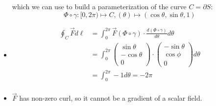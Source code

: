 \documentclass[11pt]{article}
\begin{document}
\begin{solution}
\begin{itemize}
	which we can use to build a parameterization of the curve $C = \partial S$:
	$$
	\Phi \circ \gamma: [0,2\pi) \mapsto C, (\theta) \mapsto (\cos\theta, \sin\theta, 1)
	$$
     \item 
	\begin{align*}
	\oint_C \vec{F} d\ell &= \int_0^{2\pi} \vec{F}(\Phi\circ \gamma)\cdot \frac{d(\Phi\circ \gamma)}{d\theta}  d \theta\\
	 &= \int_0^{2\pi} \begin{pmatrix} \sin\theta\\ -\cos\theta\\ 0 \end{pmatrix}\cdot \begin{pmatrix}-\sin\theta \\ \cos\phi \\ 0\end{pmatrix} d \theta\\
	&= \int_0^{2\pi} -1 d \theta = -2\pi\\
     \end{align*}   
     \item 
     $\vec F$ has  non-zero curl, so it cannot be a gradient of a scalar field. 
    \end{itemize}
\end{solution}
\end{document}
